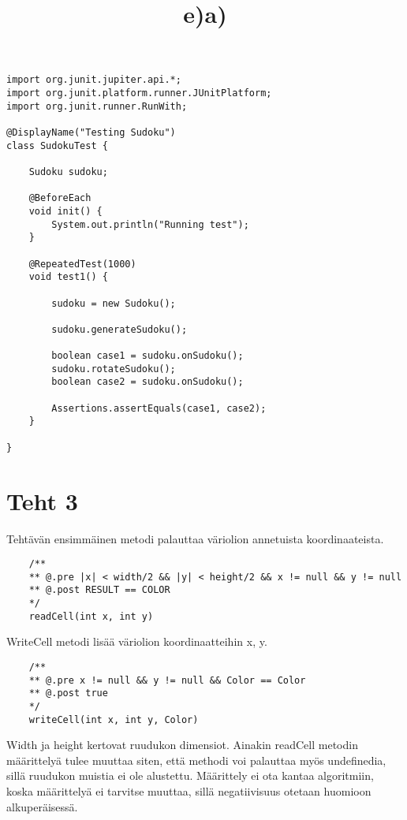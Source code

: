 \documentclass[a4paper,12pt,titlepage]{article}
\theoremstyle{definition}
\theoremstyle{remark}
\begin{document}
\title{e)}
\begin{lstlisting}
import org.junit.jupiter.api.*;
import org.junit.platform.runner.JUnitPlatform;
import org.junit.runner.RunWith;

@DisplayName("Testing Sudoku")
class SudokuTest {

    Sudoku sudoku;

    @BeforeEach
    void init() {
        System.out.println("Running test");
    }

    @RepeatedTest(1000)
    void test1() {

        sudoku = new Sudoku();

        sudoku.generateSudoku();

        boolean case1 = sudoku.onSudoku();
        sudoku.rotateSudoku();
        boolean case2 = sudoku.onSudoku();

        Assertions.assertEquals(case1, case2);
    }

}

\end{lstlisting}
\section{Teht 3}
\title{a)}
\newline
Tehtävän ensimmäinen metodi palauttaa väriolion annetuista koordinaateista.

\begin{lstlisting}
    /**
    ** @.pre |x| < width/2 && |y| < height/2 && x != null && y != null
    ** @.post RESULT == COLOR
    */
    readCell(int x, int y)
\end{lstlisting}
WriteCell metodi lisää väriolion koordinaatteihin x, y.
\begin{lstlisting}
    /**
    ** @.pre x != null && y != null && Color == Color
    ** @.post true
    */
    writeCell(int x, int y, Color)
\end{lstlisting}
Width ja height kertovat ruudukon dimensiot. Ainakin readCell metodin määrittelyä tulee muuttaa siten, että methodi voi palauttaa myös undefinedia, sillä ruudukon muistia ei ole alustettu. Määrittely ei ota kantaa algoritmiin, koska määrittelyä ei tarvitse muuttaa, sillä negatiivisuus otetaan huomioon alkuperäisessä.
\end{document}
